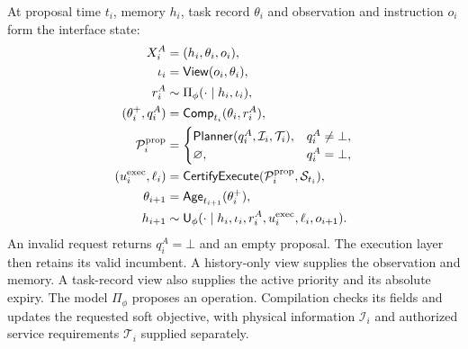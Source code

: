 \documentclass[preprint,12pt]{elsarticle}
\begin{document}
At proposal time $t_i$, memory $h_i$, task record $\theta_i$ and observation
and instruction $o_i$ form the interface state:
\begin{equation}
\begin{aligned}
X_i^A&=(h_i,\theta_i,o_i),\\
\iota_i&=\mathsf{View}(o_i,\theta_i),\\
r_i^A&\sim\Pi_\phi(\cdot\mid h_i,\iota_i),\\
(\theta_i^+,q_i^A)&=\mathsf{Comp}_{t_i}(\theta_i,r_i^A),\\
\mathcal P_i^{\rm prop}
&=\begin{cases}\mathsf{Planner}(q_i^A,\mathcal I_i,\mathcal T_i),&q_i^A\ne\bot,\\
\varnothing,&q_i^A=\bot,\end{cases}\\
(u_i^{\rm exec},\ell_i)
&=\mathsf{CertifyExecute}(\mathcal P_i^{\rm prop},\mathcal S_{t_i}),\\
\theta_{i+1}&=\mathsf{Age}_{t_{i+1}}(\theta_i^+),\\
h_{i+1}&\sim\mathsf U_\phi(\cdot\mid
h_i,\iota_i,r_i^A,u_i^{\rm exec},\ell_i,o_{i+1}).
\end{aligned}
\label{eq:new-agent-state}
\end{equation}
An invalid request returns $q_i^A=\bot$ and an empty proposal. The execution layer then retains its valid incumbent.
A history-only view supplies the observation and memory. A task-record
view also supplies the active priority and its absolute expiry. The model
$\Pi_\phi$ proposes an operation. Compilation checks its fields and updates
the requested soft objective, with physical information $\mathcal I_i$ and
authorized service requirements $\mathcal T_i$ supplied separately.
\end{document}
